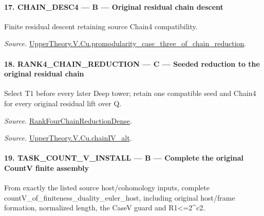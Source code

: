 \documentclass[11pt,a4paper]{article}
\numberwithin{equation}{section}
\theoremstyle{remark}\newtheorem{remark}[theorem]{Remark}
\begin{document}
\paragraph{17. CHAIN\_\allowbreak DESC4 — B — Original residual chain descent}

Finite residual descent retaining source Chain4 compatibility.

\emph{Source.} \href{https://github.com/CocoSgt/riemann-hypothesis-lean/blob/7cbf7a0c32fca1badf05931879a37c3f8a2b03b4/src/Development/AutomorphicArithmetic/AutomorphicVarieties/ModularityArgument/ThresholdArguments/DenseThresholdCases/PromodularityCaseThreeOfLemmas.lean#L131-L153}{UpperTheory.V.Cu.promodularity\_\allowbreak case\_\allowbreak three\_\allowbreak of\_\allowbreak chain\_\allowbreak reduction}.



\paragraph{18. RANK4\_\allowbreak CHAIN\_\allowbreak REDUCTION — C — Seeded reduction to the original residual chain}

Select T1 before every later Deep tower; retain one compatible seed and Chain4 for every original residual lift over Q.

\emph{Source.} \href{https://github.com/CocoSgt/riemann-hypothesis-lean/blob/7cbf7a0c32fca1badf05931879a37c3f8a2b03b4/src/Development/AutomorphicArithmetic/AutomorphicVarieties/ModularityArgument/ThresholdArguments/DenseThresholdCases/PromodularityCaseThree.lean#L33-L39}{RankFourChainReductionDense}.

\emph{Source.} \href{https://github.com/CocoSgt/riemann-hypothesis-lean/blob/7cbf7a0c32fca1badf05931879a37c3f8a2b03b4/src/Development/AutomorphicArithmetic/AutomorphicVarieties/ModularityArgument/ThresholdArguments/DenseThresholdCases/CuPChainIV.lean#L16-L82}{UpperTheory.V.Cu.chainIV\_\allowbreak alt}.



\paragraph{19. TASK\_\allowbreak COUNT\_\allowbreak V\_\allowbreak INSTALL — B — Complete the original CountV finite assembly}

From exactly the listed source host/cohomology inputs, complete countV\_\allowbreak of\_\allowbreak finiteness\_\allowbreak duality\_\allowbreak euler\_\allowbreak host, including original host/frame formation, normalized length, the CaseV guard and R1<=2\textasciicircum{}c2.
\end{document}
